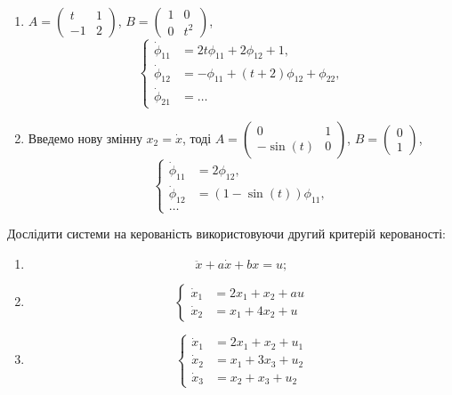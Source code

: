 \begin{solution}
	\begin{enumerate}
		\item $A = \begin{pmatrix} t & 1 \\ -1 & 2 \end{pmatrix}$, $B = \begin{pmatrix} 1 & 0 \\ 0 & t^2 \end{pmatrix}$, \[
		\left\{
			\begin{aligned}
				\dot \phi_{11} &= 2 t \phi_{11} + 2 \phi_{12} + 1, \\
				\dot \phi_{12} &= - \phi_{11} + (t + 2) \phi_{12} + \phi_{22}, \\
				\dot \phi_{21} &= \ldots 
			\end{aligned}
		\right.
		\]

		\item Введемо нову змінну $x_2 = \dot x$, тоді $A = \begin{pmatrix} 0 & 1 \\ -\sin(t) & 0 \end{pmatrix}$, $B = \begin{pmatrix} 0 \\ 1 \end{pmatrix}$, \[
		\left\{
			\begin{aligned}
				\dot \phi_{11} &= 2 \phi_{12}, \\
				\dot \phi_{12} &= (1 - \sin(t)) \phi_{11}, \\
				\ldots 
			\end{aligned}
		\right.
		\]
	\end{enumerate}
\end{solution}

\begin{problem}
    Дослідити системи на керованість використовуючи другий критерій керованості:
    \begin{enumerate}
        \item \[\ddot x + a \dot x + b x = u; \]
        \item \[ \left\{ \begin{aligned} \dot x_1 &= 2x_1 + x_2 + au \\ \dot x_2 &= x_1 + 4 x_2 + u \end{aligned} \right. \]
        \item \[ \left\{ \begin{aligned} \dot x_1 &= 2x_1 + x_2 + u_1 \\ \dot x_2 &= x_1 + 3 x_3 + u_2 \\ \dot x_3 &= x_2 + x_3 + u_2  \end{aligned} \right. \]
    \end{enumerate}
\end{problem}

